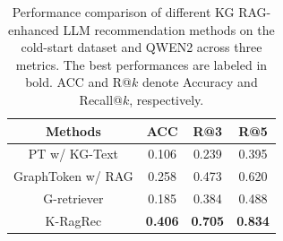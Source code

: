\begin{table}[t]
  \centering
  \caption{ Performance comparison of different KG RAG-enhanced LLM recommendation methods on the cold-start dataset and QWEN2 across three metrics. The best performances are labeled in bold. ACC and R@$k$ denote Accuracy and Recall@$k$, respectively. }
    \scalebox{0.85}
{
    \begin{tabular}{c|c|c|c}
    \toprule
    \toprule
    \multirow{1}{*}{Methods}
    & \multicolumn{1}{c|}{ACC} & \multicolumn{1}{c|}{R@3} & \multicolumn{1}{c}{R@5} \\
    \midrule
    PT w/ KG-Text &0.106  &0.239 &0.395  \\
    GraphToken w/ RAG &0.258  &0.473 &0.620 \\
    G-retriever &0.185  &0.384 &0.488  \\
    \midrule
 K-RagRec &\textbf{0.406}  &\textbf{0.705} &\textbf{0.834}  \\
    \bottomrule
    \bottomrule
    \end{tabular}%
}
  \label{tab:cold_start}%
\end{table}%